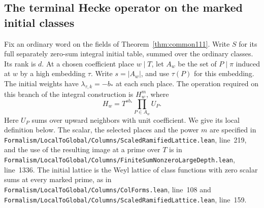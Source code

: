 \documentclass[a4paper,11pt]{article}
\theoremstyle{definition}
\theoremstyle{remark}
\newcommand{\srcloc}[2]{{\small\nolinkurl{#1.lean}}, line~#2}
\numberwithin{equation}{section}
\begin{document}
\subsection{The terminal Hecke operator on the marked initial classes}
\label{sec:neighbormove356}

Fix an ordinary word on the fields of Theorem~\ref{thm:common111}.
Write \(S\) for its full separately zero-sum integral initial
table, summed over the ordinary classes. Its rank is \(d\).
At a chosen coefficient place \(w\mid T\), let \(A_w\) be the
set of \(P\mid\pi\) induced at \(w\) by a high embedding
\(\tau\). Write \(s=|A_w|\), and use \(\tau(P)\) for this
embedding. The initial weights have \(\lambda_{\tau,k}=-b_*\)
at each such place. The operation required on this branch of
the integral construction is \(H_w^m\), where
\[
                  H_w=T^{s b_*}\prod_{P\in A_w} U_P .
\]
Here \(U_P\) sums over upward neighbors with unit coefficient.
We give its local definition below. The scalar, the selected
places and the power \(m\) are specified in
\srcloc{Formalism/LocalToGlobal/Columns/ScaledRamifiedLattice}{219},
and the use of the resulting image at a prime over \(T\) is in
\srcloc{Formalism/LocalToGlobal/Columns/FiniteSumNonzeroLargeDepth}{1336}.
The initial lattice is the Weyl lattice of class functions with
zero scalar sums at every marked prime, as in
\srcloc{Formalism/LocalToGlobal/Columns/ColForms}{108}
and \srcloc{Formalism/LocalToGlobal/Columns/ScaledRamifiedLattice}{159}.
\end{document}
